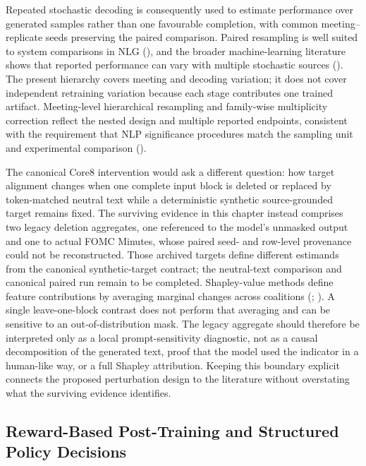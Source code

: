 Repeated stochastic decoding is consequently used to estimate performance
over generated samples rather than one favourable completion, with common
meeting--replicate seeds preserving the paired comparison. Paired resampling
is well suited to system comparisons in NLG (\cite{deutsch2021statistical}),
and the broader machine-learning literature shows that reported performance
can vary with multiple stochastic sources (\cite{bouthillier2021accounting}).
The present hierarchy covers meeting and decoding variation; it does not cover
independent retraining variation because each stage contributes one trained
artifact. Meeting-level hierarchical resampling and family-wise multiplicity
correction reflect the nested design and multiple reported endpoints,
consistent with the requirement that NLP significance procedures match the
sampling unit and experimental comparison (\cite{dror2018hitchhiker}).

The canonical Core8 intervention would ask a different question: how target
alignment changes when one complete input block is deleted or replaced by
token-matched neutral text while a deterministic synthetic source-grounded
target remains fixed. The surviving evidence in this chapter instead
comprises two legacy deletion aggregates, one referenced to the model's
unmasked output and one to actual FOMC Minutes, whose paired seed- and
row-level provenance could not be reconstructed. Those archived targets define
different estimands from the canonical synthetic-target contract; the
neutral-text comparison and canonical paired run remain to be completed.
Shapley-value methods define feature contributions by
averaging marginal changes across coalitions (\cite{shapley1953value};
\cite{lundberg2017unified}). A single leave-one-block contrast does not perform
that averaging and can be sensitive to an out-of-distribution mask. The legacy
aggregate should therefore be interpreted only as a local prompt-sensitivity
diagnostic, not as a causal decomposition of the generated text, proof that
the model used the indicator in a human-like way, or a full Shapley
attribution. Keeping this boundary explicit connects the proposed
perturbation design to the literature without overstating what the surviving
evidence identifies.

\subsection{Reward-Based Post-Training and Structured Policy Decisions}
\label{ch2:sec:lr:decision}

